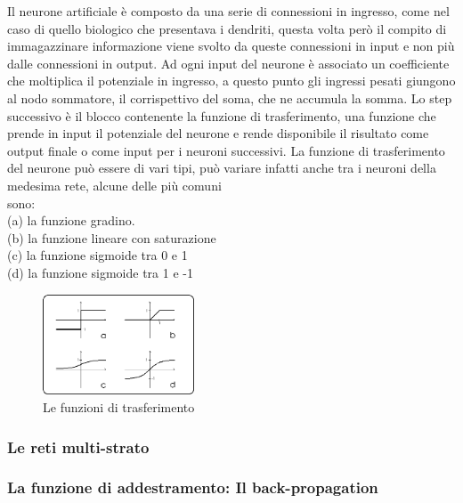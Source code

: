 \documentclass[10pt,a4paper]{article}
\begin{document}
Il neurone artificiale è composto da una serie di connessioni in ingresso, come nel caso di quello biologico che presentava i dendriti, questa volta però il compito di immagazzinare informazione viene svolto da queste connessioni in input e non più dalle connessioni in output. 
Ad ogni input del neurone è associato un coefficiente che moltiplica il potenziale in ingresso, a questo punto gli ingressi pesati giungono al nodo sommatore, il corrispettivo del soma, che ne accumula la somma.
Lo step successivo è il blocco contenente la funzione di trasferimento, una funzione che prende in input il potenziale del neurone e rende disponibile il risultato come output finale o come input per i neuroni successivi.
La funzione di trasferimento del neurone può essere di vari tipi, può variare infatti anche tra i neuroni della medesima rete, alcune delle più comuni \\sono: \\
(a) la funzione gradino. \\
(b) la funzione lineare con saturazione \\
(c) la funzione sigmoide tra 0 e 1 \\
(d) la funzione sigmoide tra 1 e -1 \\


\begin{figure}
	\centering
	\vspace{-120pt}
    \includegraphics[width=0.4\textwidth]{FDTs.png}
  	\caption{Le funzioni di trasferimento}
  	\label{fig:graph4}
\end{figure}


 

\subsubsection*{Le reti multi-strato} 

\subsubsection{La funzione di addestramento: Il back-propagation} 
\end{document}
